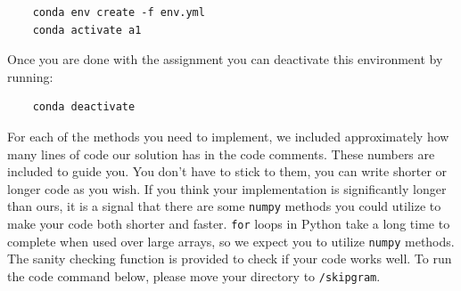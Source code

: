 \documentclass{assignment format}
\begin{document}
\begin{verbatim}
    conda env create -f env.yml
    conda activate a1
\end{verbatim}

Once you are done with the assignment you can deactivate this environment by running:
\begin{verbatim}
    conda deactivate
\end{verbatim}
For each of the methods you need to implement, we included approximately how many lines of code our solution has in the code comments. These numbers are included to guide you. You don't have to stick to them, you can write shorter or longer code as you wish. If you think your implementation is significantly longer than ours, it is a signal that there are some \texttt{numpy} methods you could utilize to make your code both shorter and faster. \texttt{for} loops in Python take a long time to complete when used over large arrays, so we expect you to utilize \texttt{numpy} methods. The sanity checking function is provided to check if your code works well.
\newline
To run the code command below, please move your directory to \texttt{/skipgram}.
\end{document}

